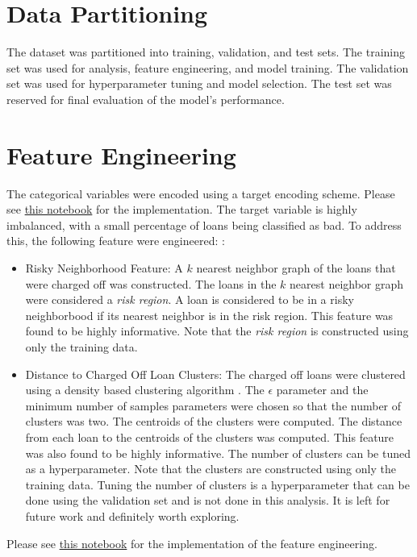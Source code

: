 \documentclass[12pt]{article}
\begin{document}
\section{Data Partitioning}
The dataset was partitioned into training, validation, and test sets. The training set was used for analysis, feature engineering, and model training. The validation set was used for hyperparameter tuning and model selection. The test set was reserved for final evaluation of the model's performance. 


\section{Feature Engineering}
The categorical variables were encoded using a target encoding scheme. Please see \href{https://github.com/rajivsam/descriptive_analytics/blob/main/notebooks/sba_loan_numeric_enc.ipynb}{this notebook} for the implementation. The target variable is highly imbalanced, with a small percentage of loans being classified as bad. To address this, the following feature were engineered: :
\begin{itemize}
    \item Risky Neighborhood Feature: A $k$ nearest neighbor graph of the loans that were charged off was constructed. The loans in the $k$ nearest neighbor graph were considered a \emph{risk region}. A loan is considered to be in a risky neighborbood if its nearest neighbor is in the risk region. This feature was found to be highly informative. Note that the \emph{risk region} is constructed using only the training data.
    \item Distance to Charged Off Loan Clusters: The charged off loans were clustered using a density based clustering algorithm \cite{ester1996density}. The $\epsilon$ parameter and the minimum number of samples parameters were chosen so that the number of clusters was two. The centroids of the clusters were computed. The distance from each loan to the centroids of the clusters was computed. This feature was also found to be highly informative. The number of clusters can be tuned as a hyperparameter. Note that the clusters are constructed using only the training data. Tuning the number of clusters is a hyperparameter that can be done using the validation set and is not done in this analysis. It is left for future work and definitely worth exploring.
\end{itemize}
Please see \href{https://github.com/rajivsam/descriptive_analytics/blob/main/notebooks/sba_bad_borr_graph_ctor.ipynb}{this notebook} for the implementation of the feature engineering.
\end{document}
